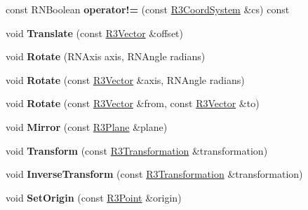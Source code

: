 \begin{DoxyCompactItemize}
\item 
const R\+N\+Boolean {\bfseries operator!=} (const \hyperlink{class_r3_coord_system}{R3\+Coord\+System} \&cs) const \hypertarget{class_r3_coord_system_a8e3967c05596699fb05091eed1dea4a8}{}\label{class_r3_coord_system_a8e3967c05596699fb05091eed1dea4a8}

\item 
void {\bfseries Translate} (const \hyperlink{class_r3_vector}{R3\+Vector} \&offset)\hypertarget{class_r3_coord_system_a39a2e90a2876ad1083d7f642f2bc8069}{}\label{class_r3_coord_system_a39a2e90a2876ad1083d7f642f2bc8069}

\item 
void {\bfseries Rotate} (R\+N\+Axis axis, R\+N\+Angle radians)\hypertarget{class_r3_coord_system_a193f198655ecf24f732c1a5c62fecae5}{}\label{class_r3_coord_system_a193f198655ecf24f732c1a5c62fecae5}

\item 
void {\bfseries Rotate} (const \hyperlink{class_r3_vector}{R3\+Vector} \&axis, R\+N\+Angle radians)\hypertarget{class_r3_coord_system_a8deb9d70f2988c8546f7eb8d1d8fa79a}{}\label{class_r3_coord_system_a8deb9d70f2988c8546f7eb8d1d8fa79a}

\item 
void {\bfseries Rotate} (const \hyperlink{class_r3_vector}{R3\+Vector} \&from, const \hyperlink{class_r3_vector}{R3\+Vector} \&to)\hypertarget{class_r3_coord_system_a7a9884824e05db619d60a15a07477f7b}{}\label{class_r3_coord_system_a7a9884824e05db619d60a15a07477f7b}

\item 
void {\bfseries Mirror} (const \hyperlink{class_r3_plane}{R3\+Plane} \&plane)\hypertarget{class_r3_coord_system_aadf326f5739fbcf12433696828c57115}{}\label{class_r3_coord_system_aadf326f5739fbcf12433696828c57115}

\item 
void {\bfseries Transform} (const \hyperlink{class_r3_transformation}{R3\+Transformation} \&transformation)\hypertarget{class_r3_coord_system_a52d42142e50b89a4a68341c1e3786bc6}{}\label{class_r3_coord_system_a52d42142e50b89a4a68341c1e3786bc6}

\item 
void {\bfseries Inverse\+Transform} (const \hyperlink{class_r3_transformation}{R3\+Transformation} \&transformation)\hypertarget{class_r3_coord_system_a2aa0a170c4879816b666fdb4cbfeb48a}{}\label{class_r3_coord_system_a2aa0a170c4879816b666fdb4cbfeb48a}

\item 
void {\bfseries Set\+Origin} (const \hyperlink{class_r3_point}{R3\+Point} \&origin)\hypertarget{class_r3_coord_system_a1285c003973202ae8f8e7a27bab659f5}{}\label{class_r3_coord_system_a1285c003973202ae8f8e7a27bab659f5}


\end{DoxyCompactItemize}
